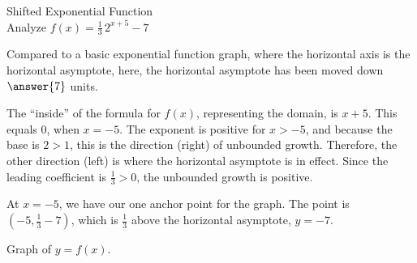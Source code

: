 \documentclass{ximera}
\begin{document}
\begin{example}  Shifted Exponential Function \\



Analyze   $f(x) = \frac{1}{3} \, 2^{x+5} - 7$ \\


\begin{explanation}

Compared to a basic exponential function graph, where the horizontal axis is the horizontal asymptote, here, the horizontal asymptote has been moved down $\answer{7}$ units.



The ``inside'' of the formula for $f(x)$, representing the domain, is $x+5$.  This equals $0$, when $x=-5$.  The exponent is positive for $x>-5$, and because the base is $2 > 1$, this is the direction (right) of unbounded growth.  Therefore, the other direction (left) is where the horizontal asymptote is in effect.  Since the leading coefficient is $\frac{1}{3} > 0$, the unbounded growth is positive.

At $x=-5$, we have our one anchor point for the graph.  The point is $\left(-5, \frac{1}{3} - 7 \right)$, which is $\frac{1}{3}$ above the horizontal asymptote, $y = -7$.


Graph of $y = f(x)$.

\begin{image}
\end{image}
\end{explanation}
\end{example}
\end{document}

